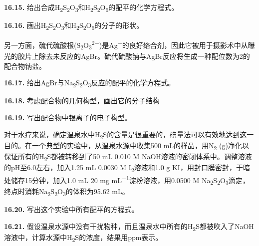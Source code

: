 \noindent\textbf{16.15.}
给出合成H\textsubscript{2}S\textsubscript{2}O\textsubscript{3}和H\textsubscript{2}S\textsubscript{2}O\textsubscript{6}的配平的化学方程式。

\noindent\textbf{16.16.}
画出H\textsubscript{2}S\textsubscript{2}O\textsubscript{3}和H\textsubscript{2}S\textsubscript{2}O\textsubscript{6}的分子的形状。

另一方面，硫代硫酸根(S\textsubscript{2}O\textsubscript{3}\textsuperscript{2−})是Ag\textsuperscript{+}的良好络合剂，因此它被用于摄影术中从曝光的胶片上除去未反应的AgBr。硫代硫酸钠与AgBr反应将生成一种配位数为2的配合物钠盐。

\noindent\textbf{16.17.}
给出AgBr与Na\textsubscript{2}S\textsubscript{2}O\textsubscript{3}反应的配平的化学方程式。

\noindent\textbf{16.18.} 考虑配合物的几何构型，画出它的分子结构

\noindent\textbf{16.19.} 写出配合物中银离子的电子构型。

对于水疗来说，确定温泉水中H\textsubscript{2}S的含量是很重要的，碘量法可以有效地达到这一目的。在一个典型的实验中，从温泉水源中收集500 mL的样品，用N\textsubscript{2} (g)净化以保证所有的H\textsubscript{2}S都被转移到了50 mL 0.010 M NaOH溶液的密闭体系中。调整溶液的pH至6.0左右，加入1.25 mL 0.0030 M I\textsubscript{2}溶液和1.0 g KI，用封口膜密封，于暗处储存15分钟，加入1.0 mL 20 mg mL\textsuperscript{−1}淀粉溶液，用0.0500 M Na\textsubscript{2}S\textsubscript{2}O\textsubscript{3}滴定，终点时消耗Na\textsubscript{2}S\textsubscript{2}O\textsubscript{3}的体积为95.62 mL。

\noindent\textbf{16.20.} 写出这个实验中所有配平的方程式。

\noindent\textbf{16.21.}
假设温泉水源中没有干扰物种，而且温泉水中所有的H\textsubscript{2}S都被吹入了NaOH溶液中，计算水源中H\textsubscript{2}S的浓度，结果用ppm表示。
